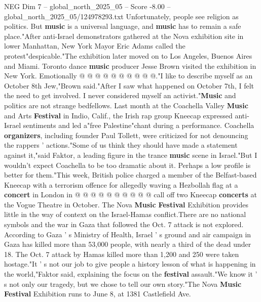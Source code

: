 \begin{textsample}{NEG Dim 7 – global\_north\_2025\_05 – Score -8.00 – global\_north\_2025\_05/124978293.txt}
Unfortunately, people see religion as politics.
But \textbf{music} is a universal language, and \textbf{music} has to remain a safe place."After anti-Israel demonstrators gathered at the Nova exhibition site in lower Manhattan, New York Mayor Eric Adams called the protest"despicable."The exhibition later moved on to Los Angeles, Buenos Aires and Miami.
Toronto dance \textbf{music} producer Jesse Brown visited the exhibition in New York.
Emotionally @ @ @ @ @ @ @ @ @ @."I like to describe myself as an October 8th Jew,"Brown said."After I saw what happened on October 7th, I felt the need to get involved.
I never considered myself an activist."\textbf{Music} and politics are not strange bedfellows.
Last month at the Coachella Valley \textbf{Music} and Arts \textbf{Festival} in Indio, Calif., the Irish rap group Kneecap expressed anti-Israel sentiments and led a"free Palestine"chant during a performance.
Coachella \textbf{organizers}, including founder Paul Tollett, were criticized for not denouncing the rappers ' actions."Some of us think they should have made a statement against it,"said Faktor, a leading figure in the trance \textbf{music} scene in Israel."But I wouldn't expect Coachella to be too dramatic about it.
Perhaps a low profile is better for them."This week, British police charged a member of the Belfast-based Kneecap with a terrorism offence for allegedly waving a Hezbollah flag at a \textbf{concert} in London in @ @ @ @ @ @ @ @ @ @ call off two Kneecap \textbf{concerts} at the Vogue Theatre in October.
The Nova \textbf{Music} \textbf{Festival} Exhibition provides little in the way of context on the Israel-Hamas conflict.There are no national symbols and the war in Gaza that followed the Oct. 7 attack is not explored.
According to Gaza ' s Ministry of Health, Israel ' s ground and air campaign in Gaza has killed more than 53,000 people, with nearly a third of the dead under 18.
The Oct. 7 attack by Hamas killed more than 1,200 and 250 were taken hostage."It ' s not our job to give people a history lesson of what is happening in the world,"Faktor said, explaining the focus on the \textbf{festival} assault."We know it ' s not only our tragedy, but we chose to tell our own story."The Nova \textbf{Music} \textbf{Festival} Exhibition runs to June 8, at 1381 Castlefield Ave.

\end{textsample}
